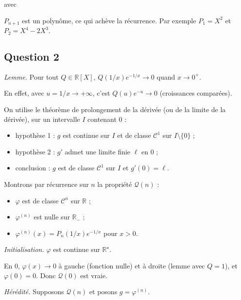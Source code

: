 \documentclass[11pt,a4paper]{article}
\providecommand{\tightlist}{\setlength{\itemsep}{0pt}\setlength{\parskip}{0pt}}
\newcommand{\equationajustee}[1]{%
  \sbox{\boiteequation}{$\displaystyle #1$}%
  \ifdim\wd\boiteequation>\linewidth
    \[\resizebox{\linewidth}{!}{\usebox{\boiteequation}}\]%
  \else
    \[#1\]%
  \fi}
\begin{document}
avec

\equationajustee{\boxed{\begin{aligned}P_0&=1\\
P_{n+1}&=X^2\,(P_n-P_n').\end{aligned}}}

\(P_{n+1}\) est un polynôme, ce qui achève la récurrence. Par exemple \(P_1=X^2\) et \(P_2=X^4-2X^3\).

\hypertarget{question-2}{%
\subsection{Question 2}\label{question-2}}

\emph{Lemme.} Pour tout \(Q\in\mathbb R[X]\), \(Q(1/x)e^{-1/x}\to0\) quand \(x\to0^+\).

En effet, avec \(u=1/x\to+\infty\), c'est \(Q(u)e^{-u}\to0\) (croissances comparées).

On utilise le théorème de prolongement de la dérivée (ou de la limite de la dérivée), sur un intervalle \(I\) contenant \(0\) :

\begin{itemize}
\tightlist
\item
  hypothèse 1 : \(g\) est continue sur \(I\) et de classe \(\mathcal C^1\) sur \(I\setminus\{0\}\) ;
\item
  hypothèse 2 : \(g'\) admet une limite finie \(\ell\) en \(0\) ;
\item
  conclusion : \(g\) est de classe \(\mathcal C^1\) sur \(I\) et \(g'(0)=\ell\).
\end{itemize}

Montrons par récurrence sur \(n\) la propriété \(\mathcal Q(n)\) :

\begin{itemize}
\tightlist
\item
  \(\varphi\) est de classe \(\mathcal C^n\) sur \(\mathbb R\) ;
\item
  \(\varphi^{(n)}\) est nulle sur \(\mathbb R_-\) ;
\item
  \(\varphi^{(n)}(x)=P_n(1/x)e^{-1/x}\) pour \(x>0\).
\end{itemize}

\emph{Initialisation.} \(\varphi\) est continue sur \(\mathbb R^\star\).

En \(0\), \(\varphi(x)\to0\) à gauche (fonction nulle) et à droite (lemme avec \(Q=1\)), et \(\varphi(0)=0\). Donc \(\mathcal Q(0)\) est vraie.

\emph{Hérédité.} Supposons \(\mathcal Q(n)\) et posons \(g=\varphi^{(n)}\).
\end{document}
